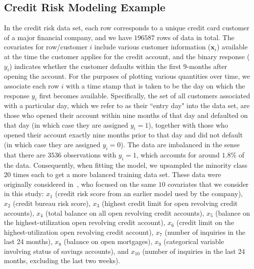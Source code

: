 \documentclass[twoside,11pt]{article}
\begin{document}
\subsection{Credit Risk Modeling Example}
\label{ss:cr_ds}
In the credit risk data set, each row corresponds to a unique credit card customer of a major financial company, and we have $196587$ rows of data in total. The covariates for row/customer $i$ include various customer information ($\bm {x}_i$) available at the time the customer applies for the credit account, and the binary response ($y_i$) indicates whether the customer defaults within the first $9$-months after opening the account. For the purposes of plotting various quantities over time, we associate each row $i$ with a time stamp that is taken to be the day on which the response $y_i$ first becomes available. Specifically, the set of all customers associated with a particular day, which we refer to as their ``entry day" into the data set, are those who opened their account within nine months of that day and defaulted on that day (in which case they are assigned $y_i=1$), together with those who opened their account exactly nine months prior to that day and did not default (in which case they are assigned $y_i=0$). The data are imbalanced in the sense that there are $3536$ observations with $y_i = 1$, which accounts for around $1.8\%$ of the data. Consequently, when fitting the model, we upsampled the minority class $20$ times each to get a more balanced training data set. These data were originally considered in~\cite{im2012time}, who focused on the same $10$ covariates that we consider in this study: $x_1$ (credit risk score from an earlier model used by the company), $x_2$ (credit bureau risk score), $x_3$ (highest credit limit for open revolving credit accounts), $x_4$ (total balance on all open revolving credit accounts), $x_5$ (balance on the highest-utilization open revolving credit account), $x_6$ (credit limit on the highest-utilization open revolving credit account), $x_7$ (number of inquiries in the last 24 months), $x_8$ (balance on open mortgages), $x_9$ (categorical variable involving status of savings accounts), and $x_{10}$ (number of inquiries in the last 24 months, excluding the last two weeks). 
\end{document}
